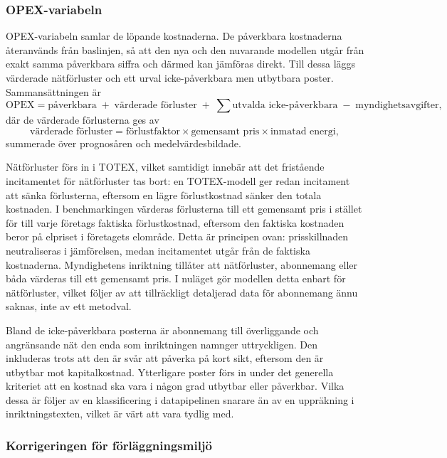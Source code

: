 \documentclass[11pt,a4paper]{article}
\begin{document}
\subsubsection{OPEX-variabeln}

OPEX-variabeln samlar de löpande kostnaderna. De påverkbara kostnaderna återanvänds från
baslinjen, så att den nya och den nuvarande modellen utgår från exakt samma påverkbara siffra och
därmed kan jämföras direkt. Till dessa läggs värderade nätförluster och ett urval icke-påverkbara
men utbytbara poster. Sammansättningen är
\[
  \mathrm{OPEX} = \text{påverkbara} \;+\; \text{värderade förluster}
  \;+\; \sum \text{utvalda icke-påverkbara} \;-\; \text{myndighetsavgifter},
\]
där de värderade förlusterna ges av
\[
  \text{värderade förluster} = \text{förlustfaktor} \times \text{gemensamt pris} \times
  \text{inmatad energi},
\]
summerade över prognosåren och medelvärdesbildade.

Nätförluster förs in i TOTEX, vilket samtidigt innebär att det fristående incitamentet för
nätförluster tas bort: en TOTEX-modell ger redan incitament att sänka förlusterna, eftersom en
lägre förlustkostnad sänker den totala kostnaden. I benchmarkingen värderas förlusterna till ett
gemensamt pris i stället för till varje företags faktiska förlustkostnad, eftersom den faktiska
kostnaden beror på elpriset i företagets elområde. Detta är principen ovan: prisskillnaden
neutraliseras i jämförelsen, medan incitamentet utgår från de faktiska kostnaderna. Myndighetens
inriktning tillåter att nätförluster, abonnemang eller båda värderas till ett gemensamt pris. I
nuläget gör modellen detta enbart för nätförluster, vilket följer av att tillräckligt detaljerad
data för abonnemang ännu saknas, inte av ett metodval.

Bland de icke-påverkbara posterna är abonnemang till överliggande och angränsande nät den enda
som inriktningen namnger uttryckligen. Den inkluderas trots att den är svår att påverka på kort
sikt, eftersom den är utbytbar mot kapitalkostnad. Ytterligare poster förs in under det generella
kriteriet att en kostnad ska vara i någon grad utbytbar eller påverkbar. Vilka dessa är följer av
en klassificering i datapipelinen snarare än av en uppräkning i inriktningstexten, vilket är värt
att vara tydlig med.

\subsubsection{Korrigeringen för förläggningsmiljö}
\end{document}
